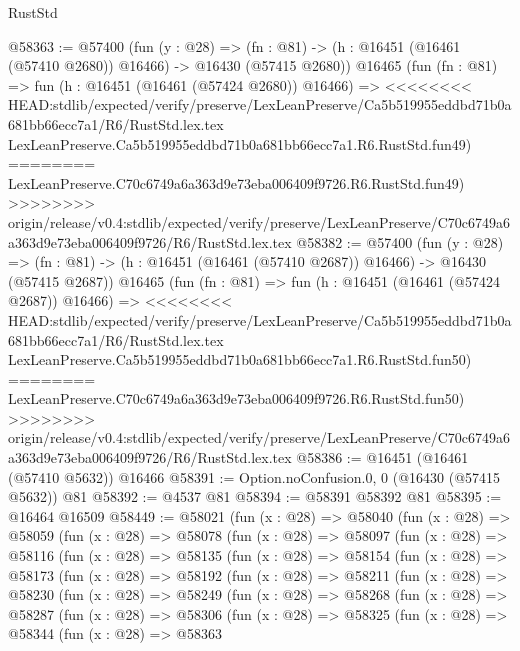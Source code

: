 \begin{lexlean}{RustStd}
\begin{coremodule}
{\begin{coremodule}
{{{{{{{{{{{{{{{{{{{{{{{{{{{{{{{{{{{{{{{{{{{{{{{{{{{{{{{@58363 := @57400
    (fun (y : @28) =>
    (fn : @81) -> (h : @16451 (@16461 (@57410 @2680)) @16466) -> @16430 (@57415 @2680))
    @16465
    (fun (fn : @81) =>
    fun (h : @16451 (@16461 (@57424 @2680)) @16466) =>
<<<<<<<< HEAD:stdlib/expected/verify/preserve/LexLeanPreserve/Ca5b519955eddbd71b0a681bb66ecc7a1/R6/RustStd.lex.tex
    LexLeanPreserve.Ca5b519955eddbd71b0a681bb66ecc7a1.R6.RustStd.fun49)
========
    LexLeanPreserve.C70c6749a6a363d9e73eba006409f9726.R6.RustStd.fun49)
>>>>>>>> origin/release/v0.4:stdlib/expected/verify/preserve/LexLeanPreserve/C70c6749a6a363d9e73eba006409f9726/R6/RustStd.lex.tex
@58382 := @57400
    (fun (y : @28) =>
    (fn : @81) -> (h : @16451 (@16461 (@57410 @2687)) @16466) -> @16430 (@57415 @2687))
    @16465
    (fun (fn : @81) =>
    fun (h : @16451 (@16461 (@57424 @2687)) @16466) =>
<<<<<<<< HEAD:stdlib/expected/verify/preserve/LexLeanPreserve/Ca5b519955eddbd71b0a681bb66ecc7a1/R6/RustStd.lex.tex
    LexLeanPreserve.Ca5b519955eddbd71b0a681bb66ecc7a1.R6.RustStd.fun50)
========
    LexLeanPreserve.C70c6749a6a363d9e73eba006409f9726.R6.RustStd.fun50)
>>>>>>>> origin/release/v0.4:stdlib/expected/verify/preserve/LexLeanPreserve/C70c6749a6a363d9e73eba006409f9726/R6/RustStd.lex.tex
@58386 := @16451 (@16461 (@57410 @5632)) @16466
@58391 := Option.noConfusion.{0, 0} (@16430 (@57415 @5632)) @81
@58392 := @4537 @81
@58394 := @58391 @58392 @81
@58395 := @16464 @16509
@58449 := @58021
    (fun (x : @28) =>
    @58040
      (fun (x : @28) =>
      @58059
        (fun (x : @28) =>
        @58078
          (fun (x : @28) =>
          @58097
            (fun (x : @28) =>
            @58116
              (fun (x : @28) =>
              @58135
                (fun (x : @28) =>
                @58154
                  (fun (x : @28) =>
                  @58173
                    (fun (x : @28) =>
                    @58192
                      (fun (x : @28) =>
                      @58211
                        (fun (x : @28) =>
                        @58230
                          (fun (x : @28) =>
                          @58249
                            (fun (x : @28) =>
                            @58268
                              (fun (x : @28) =>
                              @58287
                                (fun (x : @28) =>
                                @58306
                                  (fun (x : @28) =>
                                  @58325
                                    (fun (x : @28) =>
                                    @58344
                                      (fun (x : @28) =>
                                      @58363
}}}}}}}}}}}}}}}}}}}}}}}}}}}}}}}}}}}}}}}}}}}}}}}}}}}}}}}
\end{coremodule}}
\end{coremodule}
\end{lexlean}

